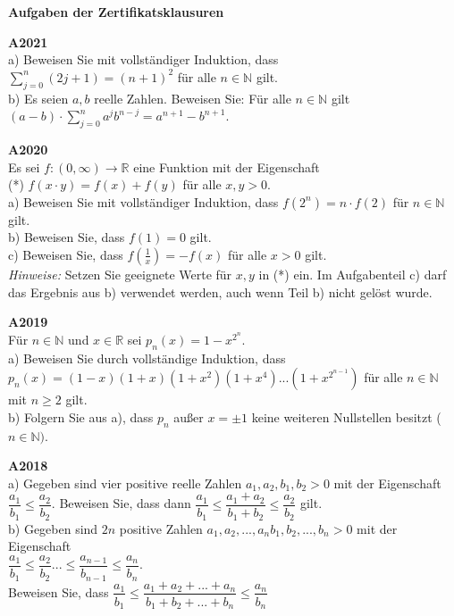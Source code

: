 \documentclass[landscape,twocolumn,a4paper]{article}
\begin{document}
\parindent 0mm


\textbf{Aufgaben der Zertifikatsklausuren}
\bigskip 

\textbf{A2021} \\
a) Beweisen Sie mit vollständiger Induktion, dass \\$\sum\limits_{j=0}^n (2j+1) = (n+1)^2$ für alle $n \in \mathbb{N}$ gilt. \\
b) Es seien $a, b$ reelle Zahlen. Beweisen Sie: Für alle $n \in \mathbb{N}$ gilt \\
$(a-b) \cdot \sum\limits_{j=0}^n a^j b^{n-j} = a^{n+1} - b^{n+1}$.


\bigskip

\textbf{A2020} \\
Es sei $f: (0,\infty) \rightarrow \mathbb{R}$ eine Funktion mit der Eigenschaft \\
(*) \quad $f(x\cdot y) = f(x) + f(y)$ für alle $x,y > 0$. \\
a) Beweisen Sie mit vollständiger Induktion, dass $f(2^n) = n \cdot f(2)$ für $n \in \mathbb{N}$ gilt. \\
b) Beweisen Sie, dass $f(1) = 0$ gilt. \\
c) Beweisen Sie, dass $f(\frac{1}{x}) = -f(x)$ für alle $x > 0$ gilt. \\

\textit{Hinweise:} Setzen Sie geeignete Werte für $x,y$ in (*) ein. Im Aufgabenteil c) darf das Ergebnis aus b)
verwendet werden, auch wenn Teil b) nicht gelöst wurde.
\bigskip

\textbf{A2019} \\
Für $n \in \mathbb{N}$ und $x \in \mathbb{R}$ sei $p_n(x) = 1 - x^{2^n}$. \\
a) Beweisen Sie durch vollständige Induktion, dass \\
$p_n(x) = (1-x)(1+x)(1+x^2)(1+x^4)...(1+x^{2^{n-1}})$ für alle $n \in \mathbb{N}$ mit $n \ge 2$ gilt. \\
b) Folgern Sie aus a), dass $p_n$ außer $x = \pm 1$ keine weiteren Nullstellen besitzt ($n \in \mathbb{N})$.
\bigskip

\textbf{A2018} \\
a) Gegeben sind vier positive reelle Zahlen $a_1, a_2, b_1, b_2 > 0$ mit der Eigenschaft
$\dfrac{a_1}{b_1} \le \dfrac{a_2}{b_2}$. Beweisen Sie, dass dann 
$\dfrac{a_1}{b_1} \le \dfrac{a_1+a_2}{b_1+b_2} \le \dfrac{a_2}{b_2}$ gilt. \\
b) Gegeben sind $2n$ positive Zahlen  $a_1, a_2,...,a_n b_1, b_2,...,b_n > 0$ mit der Eigenschaft \\
$\dfrac{a_1}{b_1} \le \dfrac{a_2}{b_2} ... \le \dfrac{a_{n-1}}{b_{n-1}} \le \dfrac{a_n}{b_n}$. \\
 Beweisen Sie, dass  
$\dfrac{a_1}{b_1} \le \dfrac{a_1+a_2+...+a_n}{b_1+b_2+...+b_n} \le \dfrac{a_n}{b_n}$ 
\bigskip
\end{document}
